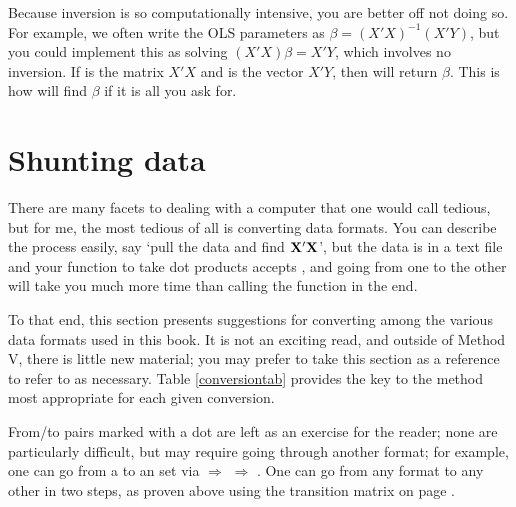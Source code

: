 Because inversion is so computationally intensive, you are better off
not doing so.  For example, we often write the OLS parameters as $\beta
=(X'X)^{-1}(X'Y)$, but you could implement this as solving
$(X'X)\beta = X'Y$, which involves no inversion. If  is the
matrix $X'X$ and  is the vector $X'Y$, then 
 will
return $\beta$. This is how  will find $\beta$ if it
is all you ask for.


\section{Shunting data} \label{asst_conversions} 
There are many facets to dealing with a computer that one would call
tedious, but for me, the most tedious of all is converting data formats.
You can describe the process easily, say `pull the data and find
${\bf X}'{\bf X}$', but the data is in a text file and your function to take dot
products accepts , and going from one
to the other will take you much more time than calling the function in
the end.

To that end, this section presents
suggestions for converting among the various data formats used in this
book. It is not an exciting
read, and outside of Method V, there is little new material; you may
prefer to take this section as a reference to refer to as necessary. Table
\ref{conversiontab} provides the key to the method most appropriate for
each given conversion. 

From/to pairs marked with a dot are
left as an exercise for the reader; none are particularly difficult, but
may require going through another format; for example, one can go from a
 to an  set via  $\Rightarrow$  $\Rightarrow$ .
One can go from any format to any other in two steps, as proven above
using the transition matrix on page \pageref{twostep}. 

